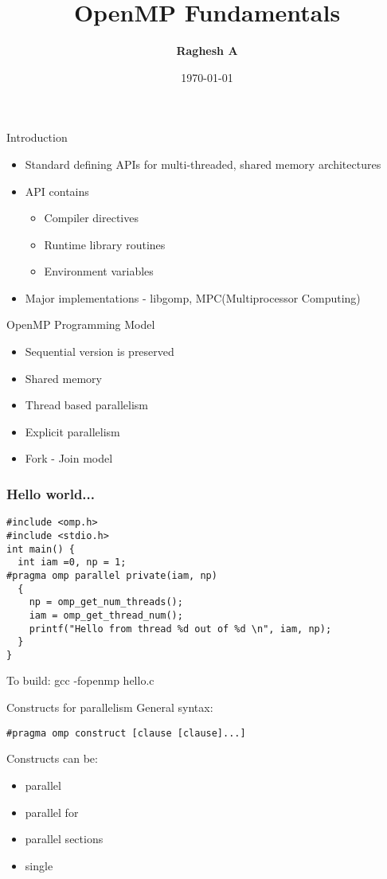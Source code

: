 \documentclass[10pt]{beamer}
\title{OpenMP Fundamentals}
\author{\textbf{Raghesh A}}
\date{\today}
\begin{document}
\begin{frame}
\titlepage
\end{frame}

\begin{frame}{Introduction}
\begin{itemize}
\item Standard defining APIs for multi-threaded, shared memory architectures
\item API contains
  \begin{itemize}
  \item Compiler directives
  \item Runtime library routines
  \item Environment variables
  \end{itemize}
\item Major implementations - libgomp, MPC(Multiprocessor Computing)
\end{itemize}
\end{frame}

\begin{frame}{OpenMP Programming Model}
\begin{itemize}
\item Sequential version is preserved
\item Shared memory
\item Thread based parallelism
\item Explicit parallelism
\item Fork - Join model
\end{itemize}
\end{frame}

\begin{frame}[fragile]
\frametitle{Hello world...}
\begin{Verbatim}[formatcom=\color{red}]
#include <omp.h>
#include <stdio.h>
int main() {        
  int iam =0, np = 1;
#pragma omp parallel private(iam, np)
  {
    np = omp_get_num_threads();
    iam = omp_get_thread_num();
    printf("Hello from thread %d out of %d \n", iam, np);
  }
}
\end{Verbatim}
To build: gcc -fopenmp hello.c
\end{frame}

\begin{frame}[fragile]{Constructs for parallelism}
General syntax:
\begin{Verbatim}
#pragma omp construct [clause [clause]...]
\end{Verbatim}
Constructs can be:
\begin{itemize}
\item parallel
\item parallel for
\item parallel sections
\item single
\end{itemize}
\end{frame}
\end{document}
